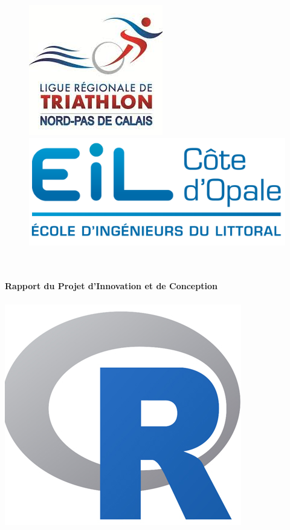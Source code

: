 \begin{titlepage}
  \begin{sffamily}
  \begin{center}
\begin{figure}
\includegraphics[scale=0.8]{img/logo_png.png} \hfill
\includegraphics[scale=0.7]{img/eilco.png} 
\end{figure}
    \textsc{\Large }\\[1.5cm]
    \HRule \\[0.4cm]
    { \huge \bfseries Rapport du Projet d'Innovation et de Conception\\[0.4cm] }
	\textsc{\Large}
    \HRule \\[2cm]
    \includegraphics[scale=0.5]{img/R_logo.png}\\[2cm]


\end{center}
\end{sffamily}
\end{titlepage}
